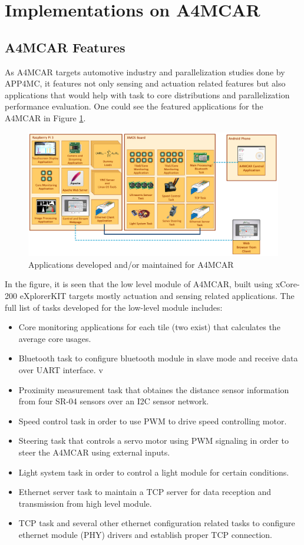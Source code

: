 \section{Implementations on A4MCAR}
\subsection{A4MCAR Features}
As A4MCAR targets automotive industry and parallelization studies done by APP4MC, it features not only sensing and actuation related features but also applications that would help with task to core distributions and parallelization performance evaluation. One could see the featured applications for the A4MCAR in Figure \ref{fig:tasksoverall}. 
\begin{figure}[!ht]
	\centering
	\includegraphics[scale=0.27]{content/images/tasksoverall.png}
	\caption{Applications developed and/or maintained for A4MCAR}
	\label{fig:tasksoverall}
\end{figure}
In the figure, it is seen that the low level module of A4MCAR, built using xCore-200 eXplorerKIT targets mostly actuation and sensing related applications. The full list of tasks developed for the low-level module includes:
\begin{itemize}
	\item Core monitoring applications for each tile (two exist) that calculates the average core usages.
	\item Bluetooth task to configure bluetooth module in slave mode and receive data over UART interface.
v	\item Proximity measurement task that obtaines the distance sensor information from four SR-04 sensors over an I2C sensor network.
	\item Speed control task in order to use PWM to drive speed controlling motor.
	\item Steering task that controls a servo motor using PWM signaling in order to steer the A4MCAR using external inputs.
	\item Light system task in order to control a light module for certain conditions.
	\item Ethernet server task to maintain a TCP server for data reception and transmission from high level module.
	\item TCP task and several other ethernet configuration related tasks to configure ethernet module (PHY) drivers and establish proper TCP connection.
\end{itemize}
